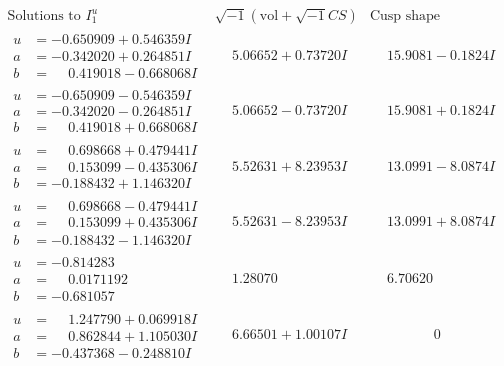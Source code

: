 \documentclass[1p]{elsarticle_modified}
\theoremstyle{definition}
\newcommand{\I}{\sqrt{-1}}
\begin{document}
$$\begin{array}{c|c|c}  
\text{Solutions to }I^u_{1}& \I (\text{vol} + \sqrt{-1}CS) & \text{Cusp shape}\\
 \hline 
\begin{aligned}
u &= -0.650909 + 0.546359 I \\
a &= -0.342020 + 0.264851 I \\
b &= \phantom{-}0.419018 - 0.668068 I\end{aligned}
 & \phantom{-}5.06652 + 0.73720 I & \phantom{-}15.9081 - 0.1824 I \\ \hline\begin{aligned}
u &= -0.650909 - 0.546359 I \\
a &= -0.342020 - 0.264851 I \\
b &= \phantom{-}0.419018 + 0.668068 I\end{aligned}
 & \phantom{-}5.06652 - 0.73720 I & \phantom{-}15.9081 + 0.1824 I \\ \hline\begin{aligned}
u &= \phantom{-}0.698668 + 0.479441 I \\
a &= \phantom{-}0.153099 - 0.435306 I \\
b &= -0.188432 + 1.146320 I\end{aligned}
 & \phantom{-}5.52631 + 8.23953 I & \phantom{-}13.0991 - 8.0874 I \\ \hline\begin{aligned}
u &= \phantom{-}0.698668 - 0.479441 I \\
a &= \phantom{-}0.153099 + 0.435306 I \\
b &= -0.188432 - 1.146320 I\end{aligned}
 & \phantom{-}5.52631 - 8.23953 I & \phantom{-}13.0991 + 8.0874 I \\ \hline\begin{aligned}
u &= -0.814283\phantom{ +0.000000I} \\
a &= \phantom{-}0.0171192\phantom{ +0.000000I} \\
b &= -0.681057\phantom{ +0.000000I}\end{aligned}
 & \phantom{-}1.28070\phantom{ +0.000000I} & \phantom{-}6.70620\phantom{ +0.000000I} \\ \hline\begin{aligned}
u &= \phantom{-}1.247790 + 0.069918 I \\
a &= \phantom{-}0.862844 + 1.105030 I \\
b &= -0.437368 - 0.248810 I\end{aligned}
 & \phantom{-}6.66501 + 1.00107 I & \phantom{-0.000000 } 0 \\ \hline\begin{aligned}

\end{aligned}
\end{array}$$
\end{document}
